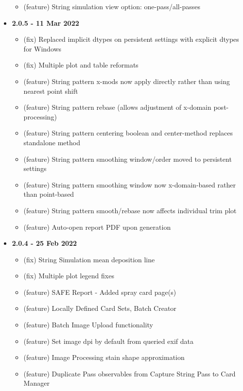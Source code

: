 \documentclass[10pt,letterpaper,titlepage]{article}
\begin{document}
\begin{itemize}
\begin{itemize}
            \item (feature) String simulation view option: one-pass/all-passes
        \end{itemize}
        \item \textbf{2.0.5 - 11 Mar 2022}
        \begin{itemize}
            \item (fix) Replaced implicit dtypes on persistent settings with explicit dtypes for Windows
            \item (fix) Multiple plot and table reformats 
            \item (feature) String pattern x-mods now apply directly rather than using nearest point shift
            \item (feature) String pattern rebase (allows adjustment of x-domain post-processing)
            \item (feature) String pattern centering boolean and center-method replaces standalone method
            \item (feature) String pattern smoothing window/order moved to persistent settings
            \item (feature) String pattern smoothing window now x-domain-based rather than point-based 
            \item (feature) String pattern smooth/rebase now affects individual trim plot
            \item (feature) Auto-open report PDF upon generation
        \end{itemize}
        \item \textbf{2.0.4 - 25 Feb 2022}
        \begin{itemize}
            \item (fix) String Simulation mean deposition line
            \item (fix) Multiple plot legend fixes
            \item (feature) SAFE Report - Added spray card page(s)
            \item (feature) Locally Defined Card Sets, Batch Creator
            \item (feature) Batch Image Upload functionality
            \item (feature) Set image dpi by default from queried exif data
            \item (feature) Image Processing stain shape approximation
            \item (feature) Duplicate Pass observables from Capture String Pass to Card Manager

\end{itemize}
\end{itemize}
\end{document}
